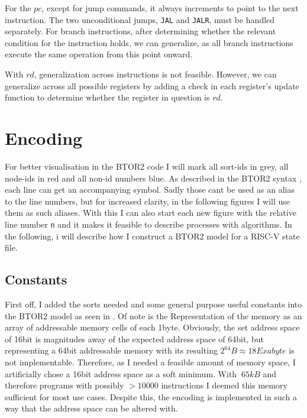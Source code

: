 For the $pc$, except for jump commands, it always increments to point to the
next instruction. The two unconditional jumps, \texttt{JAL} and \texttt{JALR},
must be handled separately. For branch instructions, after determining whether
the relevant condition for the instruction holds, we can generalize, as all
branch instructions execute the same operation from this point onward.

With $rd$, generalization across instructions is not feasible. However, we can
generalize across all possible registers by adding a check in each register's
update function to determine whether the register in question is $rd$.

\section{Encoding}
For better visualisation in the BTOR2 code I will mark all sort-ids in
\textcolor{UniGrey}{grey}, all node-ids in \textcolor{UniRed}{red} and all
non-id numbers \textcolor{UniBlue}{blue}. As described in the BTOR2 syntax
\cite[Figure 1]{btor2}, each line can get an accompanying symbol. Sadly those
cant be used as an alias to the line numbers, but for increased clarity, in the
following figures I will use them as such aliases. With this I can also start
each new figure with the relative line number \texttt{n} and it makes it
feasible to describe processes with algorithms. In the following, i will
describe how I construct a BTOR2 model for a RISC-V state file.

\subsection{Constants}
First off, I added the sorts needed and some general purpose useful constants
into the BTOR2 model as seen in . Of note is the
Representation of the memory as an array of addressable memory cells of each
1byte. Obviously, the set address space of 16bit is magnitudes away of the
expected address space of 64bit, but representing a 64bit addressable memory
with its resulting $2^{64}B \approx 18 Exabyte$ is not implementable.
Therefore, as I needed a feasible amount of memory space, I artificially chose
a 16bit address space as a soft minimum. With $~65kB$ and therefore programs
with possibly $>10000$ instructions I deemed this memory sufficient for most
use cases. Despite this, the encoding is implemented in such a way that the
address space can be altered with.  

